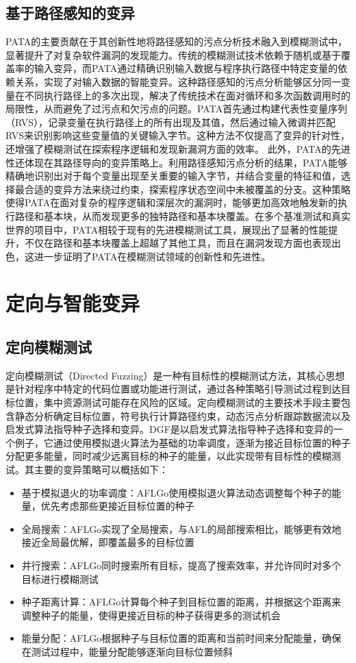 \documentclass[10.5pt,compsoc]{CjC}
\theoremstyle{mystyle}
\begin{document}
\subsection{基于路径感知的变异}
PATA\cite{PATA}的主要贡献在于其创新性地将路径感知的污点分析技术融入到模糊测试中，显著提升了对复杂软件漏洞的发现能力。传统的模糊测试技术依赖于随机或基于覆盖率的输入变异，而PATA通过精确识别输入数据与程序执行路径中特定变量的依赖关系，实现了对输入数据的智能变异。这种路径感知的污点分析能够区分同一变量在不同执行路径上的多次出现，解决了传统技术在面对循环和多次函数调用时的局限性，从而避免了过污点和欠污点的问题。PATA首先通过构建代表性变量序列（RVS），记录变量在执行路径上的所有出现及其值，然后通过输入微调并匹配RVS来识别影响这些变量值的关键输入字节。这种方法不仅提高了变异的针对性，还增强了模糊测试在探索程序逻辑和发现新漏洞方面的效率。
此外，PATA的先进性还体现在其路径导向的变异策略上。利用路径感知污点分析的结果，PATA能够精确地识别出对于每个变量出现至关重要的输入字节，并结合变量的特征和值，选择最合适的变异方法来绕过约束，探索程序状态空间中未被覆盖的分支。这种策略使得PATA在面对复杂的程序逻辑和深层次的漏洞时，能够更加高效地触发新的执行路径和基本块，从而发现更多的独特路径和基本块覆盖。在多个基准测试和真实世界的项目中，PATA相较于现有的先进模糊测试工具，展现出了显著的性能提升，不仅在路径和基本块覆盖上超越了其他工具，而且在漏洞发现方面也表现出色，这进一步证明了PATA在模糊测试领域的创新性和先进性。
\vspace {10mm}

\section{定向与智能变异}

\subsection{定向模糊测试}

定向模糊测试（Directed Fuzzing）是一种有目标性的模糊测试方法，其核心思想是针对程序中特定的代码位置或功能进行测试，通过各种策略引导测试过程到达目标位置，集中资源测试可能存在风险的区域。定向模糊测试的主要技术手段主要包含静态分析确定目标位置，符号执行计算路径约束，动态污点分析跟踪数据流以及启发式算法指导种子选择和变异。DGF是以启发式算法指导种子选择和变异的一个例子，它通过使用模拟退火算法为基础的功率调度，逐渐为接近目标位置的种子分配更多能量，同时减少远离目标的种子的能量，以此实现带有目标性的模糊测试。其主要的变异策略可以概括如下：
\begin{itemize}
\item 基于模拟退火的功率调度：AFLGo使用模拟退火算法动态调整每个种子的能量，优先考虑那些更接近目标位置的种子
\item 全局搜索：AFLGo实现了全局搜索，与AFL的局部搜索相比，能够更有效地接近全局最优解，即覆盖最多的目标位置
\item 并行搜索：AFLGo同时搜索所有目标，提高了搜索效率，并允许同时对多个目标进行模糊测试
\item 种子距离计算：AFLGo计算每个种子到目标位置的距离，并根据这个距离来调整种子的能量，使得更接近目标的种子获得更多的测试机会
\item 能量分配：AFLGo根据种子与目标位置的距离和当前时间来分配能量，确保在测试过程中，能量分配能够逐渐向目标位置倾斜
\end{itemize}
\end{document}
